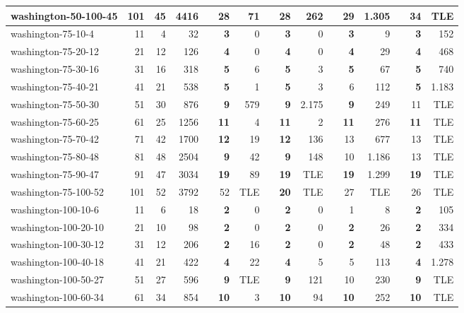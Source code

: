 \begin{table}[!ht]
{\begin{tabular}{lrrrlrrlrrlrrlrr}
washington-50-100-45 & 101 & 45 & 4416 &  & \textbf{28} & 71 &  & \textbf{28} & 262 &  & 29 & 1.305 &  & 34 & TLE \\ \hline
washington-75-10-4 & 11 & 4 & 32 &  & \textbf{3} & 0 &  & \textbf{3} & 0 &  & \textbf{3} & 9 &  & \textbf{3} & 152 \\
washington-75-20-12 & 21 & 12 & 126 &  & \textbf{4} & 0 &  & \textbf{4} & 0 &  & \textbf{4} & 29 &  & \textbf{4} & 468 \\
washington-75-30-16 & 31 & 16 & 318 &  & \textbf{5} & 6 &  & \textbf{5} & 3 &  & \textbf{5} & 67 &  & \textbf{5} & 740 \\
washington-75-40-21 & 41 & 21 & 538 &  & \textbf{5} & 1 &  & \textbf{5} & 3 &  & 6 & 112 &  & \textbf{5} & 1.183 \\
washington-75-50-30 & 51 & 30 & 876 &  & \textbf{9} & 579 &  & \textbf{9} & 2.175 &  & \textbf{9} & 249 &  & 11 & TLE \\
washington-75-60-25 & 61 & 25 & 1256 &  & \textbf{11} & 4 &  & \textbf{11} & 2 &  & \textbf{11} & 276 &  & \textbf{11} & TLE \\
washington-75-70-42 & 71 & 42 & 1700 &  & \textbf{12} & 19 &  & \textbf{12} & 136 &  & 13 & 677 &  & 13 & TLE \\
washington-75-80-48 & 81 & 48 & 2504 &  & \textbf{9} & 42 &  & \textbf{9} & 148 &  & 10 & 1.186 &  & 13 & TLE \\
washington-75-90-47 & 91 & 47 & 3034 &  & \textbf{19} & 89 &  & \textbf{19} & TLE &  & \textbf{19} & 1.299 &  & \textbf{19} & TLE \\
washington-75-100-52 & 101 & 52 & 3792 &  & 52 & TLE &  & \textbf{20} & TLE &  & 27 & TLE &  & 26 & TLE \\ \hline
washington-100-10-6 & 11 & 6 & 18 &  & \textbf{2} & 0 &  & \textbf{2} & 0 &  & 1 & 8 &  & \textbf{2} & 105 \\
washington-100-20-10 & 21 & 10 & 98 &  & \textbf{2} & 0 &  & \textbf{2} & 0 &  & \textbf{2} & 26 &  & \textbf{2} & 334 \\
washington-100-30-12 & 31 & 12 & 206 &  & \textbf{2} & 16 &  & \textbf{2} & 0 &  & \textbf{2} & 48 &  & \textbf{2} & 433 \\
washington-100-40-18 & 41 & 21 & 422 &  & \textbf{4} & 22 &  & \textbf{4} & 5 &  & 5 & 113 &  & \textbf{4} & 1.278 \\
washington-100-50-27 & 51 & 27 & 596 &  & \textbf{9} & TLE &  & \textbf{9} & 121 &  & 10 & 230 &  & \textbf{9} & TLE \\
washington-100-60-34 & 61 & 34 & 854 &  & \textbf{10} & 3 &  & \textbf{10} & 94 &  & \textbf{10} & 252 &  & \textbf{10} & TLE \\

\end{tabular}}
\end{table}
